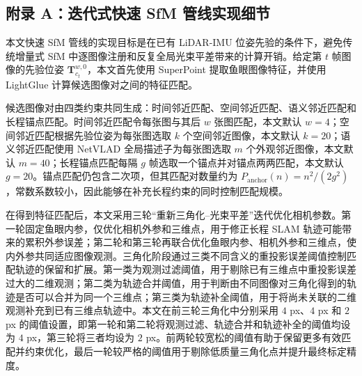 \clearpage

{

    \subsection*{附录 A：迭代式快速 SfM 管线实现细节}
    \label{app:fast-sfm}

    本文快速 SfM 管线的实现目标是在已有 LiDAR-IMU 位姿先验的条件下，避免传统增量式 SfM 中逐图像注册和反复全局光束平差带来的计算开销。给定第 \(t\) 帧图像的先验位姿 \(\mathbf{T}_{c_t}^{w,0}\)，本文首先使用 SuperPoint 提取鱼眼图像特征，并使用 LightGlue 计算候选图像对之间的特征匹配。

    候选图像对由四类约束共同生成：时间邻近匹配、空间邻近匹配、语义邻近匹配和长程锚点匹配。时间邻近匹配令每张图与其后 \(w\) 张图匹配，本文默认 \(w=4\)；空间邻近匹配根据先验位姿为每张图选取 \(k\) 个空间邻近图像，本文默认 \(k=20\)；语义邻近匹配使用 NetVLAD 全局描述子为每张图选取 \(m\) 个外观邻近图像，本文默认 \(m=40\)；长程锚点匹配每隔 \(g\) 帧选取一个锚点并对锚点两两匹配，本文默认 \(g=20\)。锚点匹配仍包含二次项，但其匹配对数量约为 \(P_{\mathrm{anchor}}(n)=n^2/(2g^2)\)，常数系数较小，因此能够在补充长程约束的同时控制匹配规模。

    在得到特征匹配后，本文采用三轮“重新三角化--光束平差”迭代优化相机参数。第一轮固定鱼眼内参，仅优化相机外参和三维点，用于修正长程 SLAM 轨迹可能带来的累积外参误差；第二轮和第三轮再联合优化鱼眼内参、相机外参和三维点，使内外参共同适应图像观测。三角化阶段通过三类不同含义的重投影误差阈值控制匹配轨迹的保留和扩展。第一类为观测过滤阈值，用于剔除已有三维点中重投影误差过大的二维观测；第二类为轨迹合并阈值，用于判断由不同图像对三角化得到的轨迹是否可以合并为同一个三维点；第三类为轨迹补全阈值，用于将尚未关联的二维观测补充到已有三维点轨迹中。本文在前三轮三角化中分别采用 \(4\) px、\(4\) px 和 \(2\) px 的阈值设置，即第一轮和第二轮将观测过滤、轨迹合并和轨迹补全的阈值均设为 \(4\) px，第三轮将三者均设为 \(2\) px。前两轮较宽松的阈值有助于保留更多有效匹配并约束优化，最后一轮较严格的阈值用于剔除低质量三角化点并提升最终标定精度。

}
